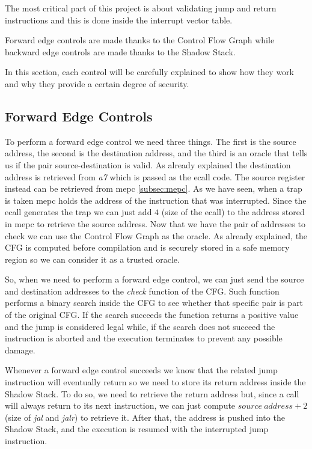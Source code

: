 The most critical part of this project is about validating jump and return instructions
and this is done inside the interrupt vector table.

Forward edge controls are made thanks to the Control Flow Graph while backward edge
controls are made thanks to the Shadow Stack.

In this section, each control will be carefully explained to show how they work
and why they provide a certain degree of security.

\subsection{Forward Edge Controls}
\label{subsec:forward}

To perform a forward edge control we need three things. The first is the source
address, the second is the destination address, and the third is an oracle that
tells us if the pair source-destination is valid. As already explained the destination
address is retrieved from \textit{a7} which is passed as the ecall code. The source
register instead can be retrieved from mepc \ref{subsec:mepc}. As we have seen, when
a trap is taken mepc holds the address of the instruction that was interrupted.
Since the ecall generates the trap we can just add $4$ (size of the ecall) to
the address stored in mepc to retrieve the source address. Now that we have the pair
of addresses to check we can use the Control Flow Graph as the oracle. As
already explained, the CFG is computed before compilation and is securely stored
in a safe memory region so we can consider it as a trusted oracle.

So, when we need to perform a forward edge control, we can just send the source and
destination addresses to the \textit{check} function of the CFG. Such function performs
a binary search inside the CFG to see whether that specific pair is part of the original
CFG. If the search succeeds the function returns a positive value and the jump
is considered legal while, if the search does not succeed the instruction is aborted
and the execution terminates to prevent any possible damage.

Whenever a forward edge control succeeds we know that the related jump instruction
will eventually return so we need to store its return address inside the Shadow Stack.
To do so, we need to retrieve the return address but, since a call will always
return to its next instruction, we can just compute $source \ address + 2$ (size
of \textit{jal} and \textit{jalr}) to retrieve it. After that, the address is pushed
into the Shadow Stack, and the execution is resumed with the interrupted jump
instruction.

